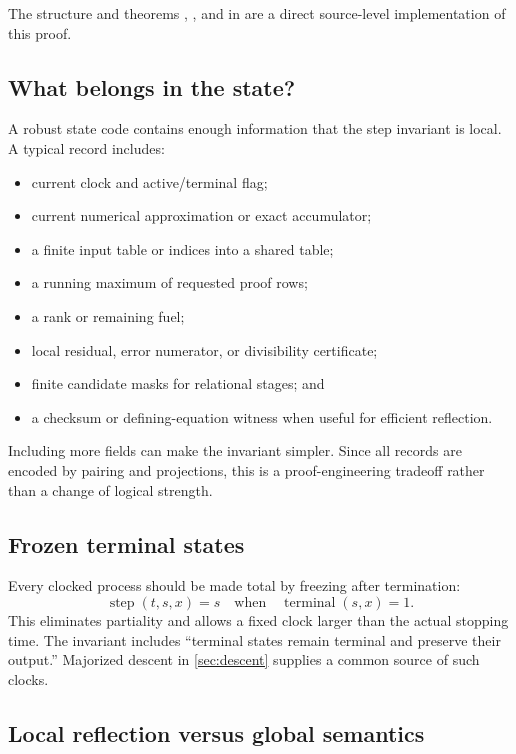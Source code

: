 The structure  and theorems , , and  in
 are a direct source-level implementation of this proof.

\subsection{What belongs in the state?}

A robust state code contains enough information that the step invariant is local.  A
typical record includes:

\begin{itemize}
\item current clock and active/terminal flag;
\item current numerical approximation or exact accumulator;
\item a finite input table or indices into a shared table;
\item a running maximum of requested proof rows;
\item a rank or remaining fuel;
\item local residual, error numerator, or divisibility certificate;
\item finite candidate masks for relational stages; and
\item a checksum or defining-equation witness when useful for efficient reflection.
\end{itemize}

Including more fields can make the invariant simpler.  Since all records are encoded by
pairing and projections, this is a proof-engineering tradeoff rather than a change of
logical strength.

\subsection{Frozen terminal states}

Every clocked process should be made total by freezing after termination:
\[
  \operatorname{step}(t,s,x)=s
  \quad\text{when}\quad\operatorname{terminal}(s,x)=1.
\]
This eliminates partiality and allows a fixed clock larger than the actual stopping
time.  The invariant includes ``terminal states remain terminal and preserve their
output.''  Majorized descent in \cref{sec:descent} supplies a common source of such
clocks.

\subsection{Local reflection versus global semantics}

